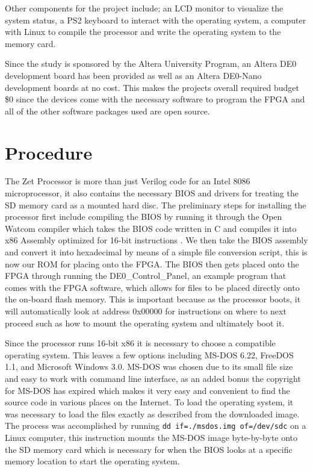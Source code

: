 \documentclass[11pt,peerreview, onecolumn]{IEEEtran}
\begin{document}
Other components for the project include; an LCD monitor to visualize the system status, a PS2 keyboard to interact with the operating system, a computer with Linux to compile the processor and write the operating system to the memory card.

Since the study is sponsored by the Altera University Program, an Altera DE0 development board has been provided as well as an Altera DE0-Nano development boards at no cost. This makes the projects overall required budget \$0 since the devices come with the necessary software to program the FPGA and all of the other software packages used are open source.

\section{Procedure}
The Zet Processor is more than just Verilog code for an Intel 8086 microprocessor, it also contains the necessary BIOS and drivers for treating the SD memory card as a mounted hard disc. The preliminary steps for installing the processor first include compiling the BIOS by running it through the Open Watcom compiler which takes the BIOS code written in C and compiles it into x86 Assembly optimized for 16-bit instructions \cite{Watcom}. We then take the BIOS assembly and convert it into hexadecimal by means of a simple file conversion script, this is now our ROM for placing onto the FPGA. The BIOS then gets placed onto the FPGA through running the DE0\_Control\_Panel, an example program that comes with the FPGA software, which allows for files to be placed directly onto the on-board flash memory. This is important because as the processor boots, it will automatically look at address 0x00000 for instructions on where to next proceed such as how to mount the operating system and ultimately boot it. 

Since the processor runs 16-bit x86 it is necessary to choose a compatible operating system. This leaves a few options including MS-DOS 6.22, FreeDOS 1.1, and Microsoft Windows 3.0. MS-DOS was chosen due to its small file size and easy to work with command line interface, as an added bonus the copyright for MS-DOS has expired which makes it very easy and convenient to find the source code in various places on the Internet. To load the operating system, it was necessary to load the files exactly as described from the downloaded image. The process was accomplished by running {\tt dd if=./msdos.img of=/dev/sdc} on a Linux computer, this instruction mounts the MS-DOS image byte-by-byte onto the SD memory card which is necessary for when the BIOS looks at a specific memory location to start the operating system.
\end{document}
